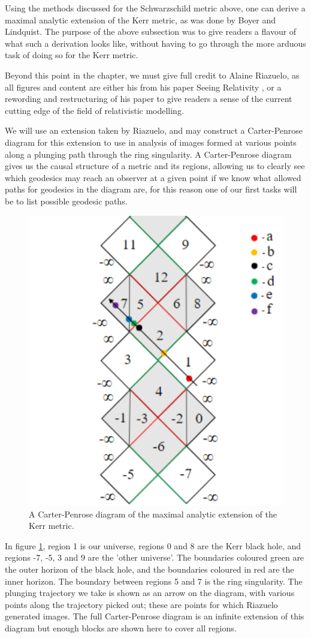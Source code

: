 \documentclass[oneside,openright,frontopenright, singlespacing]{dmathesis}
\begin{document}
	Using the methods discussed for the Schwarzschild metric above, one can derive a maximal analytic extension of the Kerr metric, as was done by Boyer and Lindquist. The purpose of the above subsection was to give readers a flavour of what such a derivation looks like, without having to go through the more arduous task of doing so for the Kerr metric. 

\vspace{1em}
	Beyond this point in the chapter, we must give full credit to Alaine Riazuelo, as all figures and content are either his from his paper Seeing Relativity \cite{seeingRelativity}, or a rewording and restructuring of his paper to give readers a sense of the current cutting edge of the field of relativistic modelling.

\vspace{1em}
	We will use an extension taken by Riazuelo, and may construct a Carter-Penrose diagram for this extension to use in analysis of images formed at various points along a plunging path through the ring singularity. A Carter-Penrose diagram gives us the causal structure of a metric and its regions, allowing us to clearly see which geodesics may reach an observer at a given point if we know what allowed paths for geodesics in the diagram are, for this reason one of our first tasks will be to list possible geodesic paths.

\vspace{1em}
\begin{figure}[!ht]
	\centering
	\includegraphics[width=0.5\linewidth]{img/carter-penrose-kerr}
	\caption{A Carter-Penrose diagram of the maximal analytic extension of the Kerr metric.}
	\label{fig:Figure6.3}
\end{figure}

\vspace{1em}
	In figure \ref{fig:Figure6.3}, region 1 is our universe, regions 0 and 8 are the Kerr black hole, and regions -7, -5, 3 and 9 are the 'other universe'. The boundaries coloured green are the outer horizon of the black hole, and the boundaries coloured in red are the inner horizon. The boundary between regions 5 and 7 is the ring singularity. The plunging trajectory we take is shown as an arrow on the diagram, with various points along the trajectory picked out; these are points for which Riazuelo generated images. The full Carter-Penrose diagram is an infinite extension of this diagram but enough blocks are shown here to cover all regions.
\end{document}
